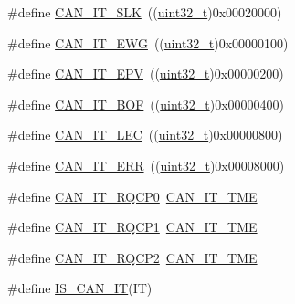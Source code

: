 \begin{DoxyCompactItemize}
\item 
\#define \hyperlink{group___c_a_n__interrupts_ga639d4ab2777d9a2f8b7e67071b091059}{C\+A\+N\+\_\+\+I\+T\+\_\+\+S\+LK}~((\hyperlink{_p_e___types_8h_a33594304e786b158f3fb30289278f5af}{uint32\+\_\+t})0x00020000)
\item 
\#define \hyperlink{group___c_a_n__interrupts_ga8a9f04ddf6ebe169d32b951a8ea135b3}{C\+A\+N\+\_\+\+I\+T\+\_\+\+E\+WG}~((\hyperlink{_p_e___types_8h_a33594304e786b158f3fb30289278f5af}{uint32\+\_\+t})0x00000100)
\item 
\#define \hyperlink{group___c_a_n__interrupts_ga006b7b641d337a599ceac64b483e75dd}{C\+A\+N\+\_\+\+I\+T\+\_\+\+E\+PV}~((\hyperlink{_p_e___types_8h_a33594304e786b158f3fb30289278f5af}{uint32\+\_\+t})0x00000200)
\item 
\#define \hyperlink{group___c_a_n__interrupts_gad63c39e6237aa07681a1f8ce2ff9e167}{C\+A\+N\+\_\+\+I\+T\+\_\+\+B\+OF}~((\hyperlink{_p_e___types_8h_a33594304e786b158f3fb30289278f5af}{uint32\+\_\+t})0x00000400)
\item 
\#define \hyperlink{group___c_a_n__interrupts_gad670b6f001bf67f24e17d91ada50a61c}{C\+A\+N\+\_\+\+I\+T\+\_\+\+L\+EC}~((\hyperlink{_p_e___types_8h_a33594304e786b158f3fb30289278f5af}{uint32\+\_\+t})0x00000800)
\item 
\#define \hyperlink{group___c_a_n__interrupts_ga65f1781c9165a2e9b5f77f1ed3990741}{C\+A\+N\+\_\+\+I\+T\+\_\+\+E\+RR}~((\hyperlink{_p_e___types_8h_a33594304e786b158f3fb30289278f5af}{uint32\+\_\+t})0x00008000)
\item 
\#define \hyperlink{group___c_a_n__interrupts_ga0c57058d6d14b2baa24a4895975b1371}{C\+A\+N\+\_\+\+I\+T\+\_\+\+R\+Q\+C\+P0}~\hyperlink{openmotestm_2library_2inc_2stm32f10x__can_8h_a619e36230fa2eb089a7c1936b5004eb9}{C\+A\+N\+\_\+\+I\+T\+\_\+\+T\+ME}
\item 
\#define \hyperlink{group___c_a_n__interrupts_ga42e5c8e89e0f06f3250916fcfb21dc22}{C\+A\+N\+\_\+\+I\+T\+\_\+\+R\+Q\+C\+P1}~\hyperlink{openmotestm_2library_2inc_2stm32f10x__can_8h_a619e36230fa2eb089a7c1936b5004eb9}{C\+A\+N\+\_\+\+I\+T\+\_\+\+T\+ME}
\item 
\#define \hyperlink{group___c_a_n__interrupts_gacc634c3e29cdc9622081021dcda3127b}{C\+A\+N\+\_\+\+I\+T\+\_\+\+R\+Q\+C\+P2}~\hyperlink{openmotestm_2library_2inc_2stm32f10x__can_8h_a619e36230fa2eb089a7c1936b5004eb9}{C\+A\+N\+\_\+\+I\+T\+\_\+\+T\+ME}
\item 
\#define \hyperlink{group___c_a_n__interrupts_ga062e922c41d2729fc37257167de93302}{I\+S\+\_\+\+C\+A\+N\+\_\+\+IT}(IT)            
\item 

\end{DoxyCompactItemize}
